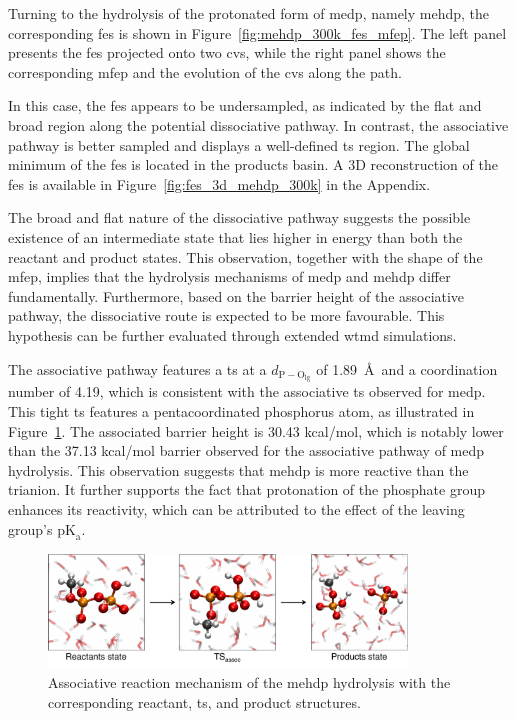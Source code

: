 Turning to the hydrolysis of the protonated form of \ac{medp}, namely \ac{mehdp}, the corresponding \ac{fes} is shown in Figure~\ref{fig:mehdp_300k_fes_mfep}. The left panel presents the \ac{fes} projected onto two \acp{cv}, while the right panel shows the corresponding \ac{mfep} and the evolution of the \acp{cv} along the path.

In this case, the \ac{fes} appears to be undersampled, as indicated by the flat and broad region along the potential dissociative pathway. In contrast, the associative pathway is better sampled and displays a well-defined \ac{ts} region. The global minimum of the \ac{fes} is located in the products basin. A 3D reconstruction of the \ac{fes} is available in Figure~\ref{fig:fes_3d_mehdp_300k} in the Appendix.

The broad and flat nature of the dissociative pathway suggests the possible existence of an intermediate state that lies higher in energy than both the reactant and product states. This observation, together with the shape of the \ac{mfep}, implies that the hydrolysis mechanisms of \ac{medp} and \ac{mehdp} differ fundamentally. Furthermore, based on the barrier height of the associative pathway, the dissociative route is expected to be more favourable. This hypothesis can be further evaluated through extended \ac{wtmd} simulations.

The associative pathway features a \ac{ts} at a $d_\mathrm{P-O_{\mathrm{lg}}}$ of 1.89~\AA\ and a coordination number of 4.19, which is consistent with the associative \ac{ts} observed for \ac{medp}. This tight \ac{ts} features a pentacoordinated phosphorus atom, as illustrated in Figure~\ref{fig:mehdp_reaction_mechanism}. The associated barrier height is 30.43 kcal/mol, which is notably lower than the 37.13 kcal/mol barrier observed for the associative pathway of \ac{medp} hydrolysis. This observation suggests that \ac{mehdp} is more reactive than the trianion. It further supports the fact that protonation of the phosphate group enhances its reactivity, which can be attributed to the effect of the leaving group's $\mathrm{pK}_\mathrm{a}$.

\begin{figure}[b!]
\centering
\includegraphics[width=0.85\textwidth]{Figures/4_Results/results_mehdp_mechanism.pdf}
\caption{Associative reaction mechanism of the \ac{mehdp} hydrolysis with the corresponding reactant, \ac{ts}, and product structures.}
\label{fig:mehdp_reaction_mechanism}
\end{figure}

